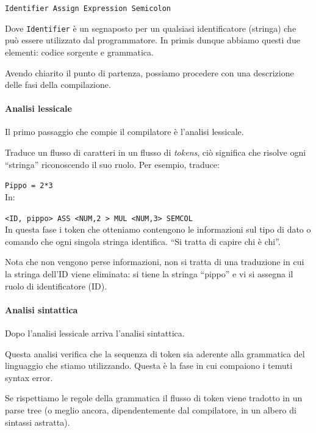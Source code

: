 \documentclass[class=book, crop=false, oneside, 12pt]{standalone}
\begin{document}
\texttt{Identifier Assign Expression Semicolon}

Dove \texttt{Identifier} è un segnaposto per un qualsiasi identificatore (stringa) che può essere utilizzato dal programmatore.
In primis dunque abbiamo questi due elementi: codice sorgente e grammatica.

Avendo chiarito il punto di partenza, possiamo procedere con una descrizione delle fasi della compilazione.

\paragraph{Analisi lessicale}
Il primo passaggio che compie il compilatore è l’analisi lessicale.

Traduce un flusso di caratteri in un flusso di \emph{tokens}, ciò significa che risolve ogni “stringa” riconoscendo il suo ruolo. Per esempio, traduce:

\texttt{Pippo = 2*3}\\
In:

\texttt{<ID, pippo> ASS <NUM,2 > MUL <NUM,3> SEMCOL}\\
In questa fase i token che otteniamo contengono le informazioni sul tipo di dato o comando che ogni singola stringa identifica. “Si tratta di capire chi è chi”.

Nota che non vengono perse informazioni, non si tratta di una traduzione in cui la stringa dell’ID viene eliminata: si tiene la stringa “pippo” e vi si assegna il ruolo di identificatore (ID).

\paragraph{Analisi sintattica}
Dopo l’analisi lessicale arriva l’analisi sintattica.

Questa analisi verifica che la sequenza di token sia aderente alla grammatica del linguaggio che stiamo utilizzando. Questa è la fase in cui compaiono i temuti syntax error.

Se rispettiamo le regole della grammatica il flusso di token viene tradotto in un parse tree (o meglio ancora, dipendentemente dal compilatore, in un albero di sintassi astratta).
\end{document}
